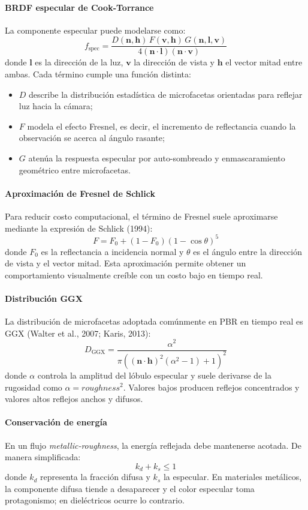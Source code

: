 \paragraph{BRDF especular de Cook-Torrance}
La componente especular puede modelarse como:
\[
f_{\text{spec}} = \frac{D(\mathbf{n},\mathbf{h})\, F(\mathbf{v},\mathbf{h})\, G(\mathbf{n},\mathbf{l},\mathbf{v})}{4(\mathbf{n}\cdot\mathbf{l})(\mathbf{n}\cdot\mathbf{v})}
\]
donde $\mathbf{l}$ es la dirección de la luz, $\mathbf{v}$ la dirección de vista y $\mathbf{h}$ el vector mitad entre ambas. Cada término cumple una función distinta:
\begin{itemize}
    \item $D$ describe la distribución estadística de microfacetas orientadas para reflejar luz hacia la cámara;
    \item $F$ modela el efecto Fresnel, es decir, el incremento de reflectancia cuando la observación se acerca al ángulo rasante;
    \item $G$ atenúa la respuesta especular por auto-sombreado y enmascaramiento geométrico entre microfacetas.
\end{itemize}

\paragraph{Aproximación de Fresnel de Schlick}
Para reducir costo computacional, el término de Fresnel suele aproximarse mediante la expresión de Schlick (1994):
\[
F = F_0 + (1 - F_0)(1 - \cos\theta)^5
\]
donde $F_0$ es la reflectancia a incidencia normal y $\theta$ es el ángulo entre la dirección de vista y el vector mitad. Esta aproximación permite obtener un comportamiento visualmente creíble con un costo bajo en tiempo real.

\paragraph{Distribución GGX}
La distribución de microfacetas adoptada comúnmente en PBR en tiempo real es GGX (Walter et al., 2007; Karis, 2013):
\[
D_{\text{GGX}} = \frac{\alpha^2}{\pi\left((\mathbf{n}\cdot\mathbf{h})^2(\alpha^2 - 1) + 1\right)^2}
\]
donde $\alpha$ controla la amplitud del lóbulo especular y suele derivarse de la rugosidad como $\alpha = roughness^2$. Valores bajos producen reflejos concentrados y valores altos reflejos anchos y difusos.

\paragraph{Conservación de energía}
En un flujo \textit{metallic-roughness}, la energía reflejada debe mantenerse acotada. De manera simplificada:
\[
k_d + k_s \leq 1
\]
donde $k_d$ representa la fracción difusa y $k_s$ la especular. En materiales metálicos, la componente difusa tiende a desaparecer y el color especular toma protagonismo; en dieléctricos ocurre lo contrario.

